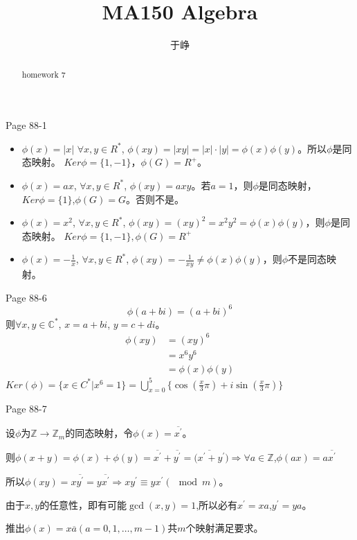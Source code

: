 \documentclass{ximera}
\title{MA150 Algebra}
\author{于峥}
\begin{document}
\begin{abstract}
    homework 7
\end{abstract}

\maketitle

\begin{problem} Page 88-1
    \begin{solution}
        \begin{itemize}
            \item $\phi(x) = |x|$
            $\forall x, y \in R^*$, $\phi(xy)=|xy|=|x|\cdot|y|=\phi(x)\phi(y)$。所以$\phi$是同态映射。
            $Ker \phi = \{1, -1\}$，$\phi(G)=R^+$。
            \item $\phi(x) = ax$, 
            $\forall x, y \in R^*$, $\phi(xy)=axy$。若$a = 1$，则$\phi$是同态映射，$Ker \phi = \{1\}$,$\phi(G)=G$。否则不是。
            \item $\phi(x) = x^2$,
            $\forall x, y \in R^*$, $\phi(xy) = (xy)^2 = x^2y^2 = \phi(x)\phi(y)$，则$\phi$是同态映射。
            $Ker \phi = \{1, -1\}, \phi(G)=R^+$
            \item $\phi(x) = - \frac 1 x$,
            $\forall x, y \in R^*$, $\phi(xy) = - \frac 1 {xy} \not= \phi(x)\phi(y)$，则$\phi$不是同态映射。
        \end{itemize}
    \end{solution}
\end{problem}

\begin{problem} Page 88-6
    $$\phi(a + bi) = (a + bi)^6$$
    则$\forall x, y \in \mathbb{C}^*$, $x = a + bi$, $y = c + di$。
    $$
        \begin{aligned}
            \phi(xy) &= (xy)^6 \\
            &= x^6y^6 \\
            &= \phi(x)\phi(y)
        \end{aligned}
    $$
    $Ker(\phi) = \{ x \in C^* | x^6 = 1 \} = \bigcup_{x=0}^5\{ \cos(\frac x 3 \pi) + i\sin(\frac x 3 \pi) \}$
\end{problem}

\begin{problem} Page 88-7
    \begin{solution}
        设$\phi$为$\mathbb{Z} \rightarrow \mathbb{Z}_m$的同态映射，令$\phi(x)=\overline{x^{'}}$。

        则$\phi(x+y)=\phi(x)+\phi(y)=\overline{x^{'}}+\overline{y^{'}}=\overline{(x^{'}+y^{'}}) \Rightarrow \forall a \in \mathbb{Z}$,$\phi(ax)=a\overline{x^{'}}$
        
        所以$\phi(xy)=x\overline{y^{'}}=y\overline{x^{'}} \Rightarrow xy^{'} \equiv yx^{'} (\mod m)$。

        由于$x, y$的任意性，即有可能$\gcd(x,y)=1$,所以必有$x^{'}=xa$,$y^{'}=ya$。

        推出$\phi(x)=x\overline{a}(a = 0, 1, \dots, m-1)$共$m$个映射满足要求。
    \end{solution}
\end{problem}
\end{document}
